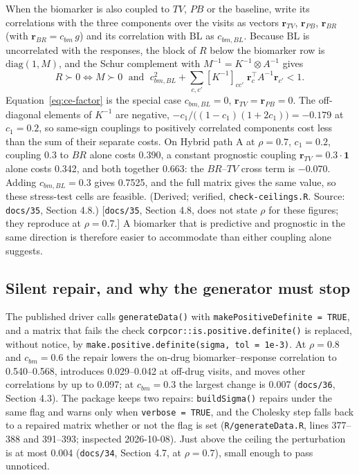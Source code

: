 \documentclass[11pt]{article}
\newcommand{\note}[1]{\textcolor{blue!60!black}{\small [#1]}}
\newcommand{\code}[1]{\texttt{#1}}
\begin{document}
When the biomarker is also coupled to $TV$, $PB$ or the baseline, write
its correlations with the three components over the visits as vectors
$\mathbf r_{TV}$, $\mathbf r_{PB}$, $\mathbf r_{BR}$ (with $\mathbf r_{BR} = c_{bm}\,g$) and its
correlation with $\mathrm{BL}$ as $c_{bm,BL}$. Because $\mathrm{BL}$ is
uncorrelated with the responses, the block of $R$ below the biomarker
row is $\mathrm{diag}(1, M)$, and the Schur complement with
$M^{-1} = K^{-1} \otimes A^{-1}$ gives
\begin{equation}
R \succ 0 \iff M \succ 0 \;\text{ and }\;
c_{bm,BL}^2 + \sum_{c, c'} [K^{-1}]_{cc'}\; \mathbf r_c^{\top} A^{-1} \mathbf r_{c'} < 1.
\label{eq:ce-general}
\end{equation}
Equation~\eqref{eq:ce-factor} is the special case $c_{bm,BL} = 0$,
$\mathbf r_{TV} = \mathbf r_{PB} = 0$. The off-diagonal elements of $K^{-1}$ are
negative, $-c_1/\bigl((1 - c_1)(1 + 2c_1)\bigr) = -0.179$ at
$c_1 = 0.2$, so same-sign couplings to positively correlated
components cost less than the sum of their separate costs. On Hybrid
path A at $\rho = 0.7$, $c_1 = 0.2$, coupling 0.3 to $BR$ alone costs
0.390, a constant prognostic coupling $\mathbf r_{TV} = 0.3\cdot\mathbf 1$
alone costs 0.342, and both together 0.663: the $BR$--$TV$ cross term
is $-0.070$. Adding $c_{bm,BL} = 0.3$ gives 0.7525, and the full matrix
gives the same value, so these stress-test cells are feasible.
(Derived; verified, \code{check-ceilings.R}. Source: \code{docs/35},
Section 4.8.) \note{\code{docs/35}, Section 4.8, does not state $\rho$
for these figures; they reproduce at $\rho = 0.7$.} A biomarker that
is predictive and prognostic in the same direction is therefore easier
to accommodate than either coupling alone suggests.

\subsection{Silent repair, and why the generator must stop}
\label{sec:ce-repair}

The published driver calls \code{generateData()} with
\code{makePositiveDefinite = TRUE}, and a matrix that fails the check
\code{corpcor::is.positive.definite()} is replaced, without notice, by
\code{make.positive.definite(sigma, tol = 1e-3)}. At
$\rho = 0.8$ and $c_{bm} = 0.6$ the repair lowers the on-drug
biomarker--response correlation to 0.540--0.568, introduces 0.029--0.042
at off-drug visits, and moves other correlations by up to 0.097; at
$c_{bm} = 0.3$ the largest change is 0.007 (\code{docs/36}, Section
4.3). The package keeps two repairs: \code{buildSigma()} repairs under
the same flag and warns only when \code{verbose = TRUE}, and the
Cholesky step falls back to a repaired matrix whether or not the flag
is set (\code{R/generateData.R}, lines 377--388 and 391--393; inspected
2026-10-08). Just above the ceiling the perturbation is at most 0.004
(\code{docs/34}, Section 4.7, at $\rho = 0.7$), small enough to pass
unnoticed.
\end{document}
